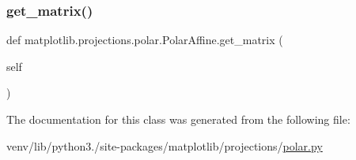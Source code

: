 \subsubsection{\texorpdfstring{get\+\_\+matrix()}{get\_matrix()}}
{\footnotesize\ttfamily def matplotlib.\+projections.\+polar.\+Polar\+Affine.\+get\+\_\+matrix (\begin{DoxyParamCaption}\item[{}]{self }\end{DoxyParamCaption})}



The documentation for this class was generated from the following file\+:\begin{DoxyCompactItemize}
\item 
venv/lib/python3./site-\/packages/matplotlib/projections/\hyperlink{polar_8py}{polar.\+py}\end{DoxyCompactItemize}
